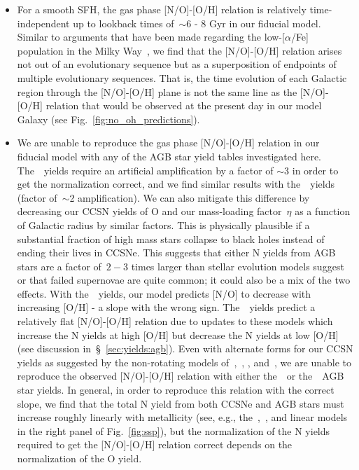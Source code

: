 \documentclass[ms.tex]{subfiles}
\begin{document}
\begin{itemize}
	\item For a smooth SFH, the gas phase [N/O]-[O/H] relation is relatively
	time-independent up to lookback times of~$\sim$6 - 8 Gyr in our fiducial
	model.
	Similar to arguments that have been made regarding the low-[$\alpha$/Fe]
	population in the Milky Way~\citep[e.g.][]{Schoenrich2009, Sharma2020,
	Johnson2021}, we find that the [N/O]-[O/H] relation arises not out of an
	evolutionary sequence but as a superposition of endpoints of multiple
	evolutionary sequences.
	That is, the time evolution of each Galactic region through the [N/O]-[O/H]
	plane is not the same line as the [N/O]-[O/H] relation that would be
	observed at the present day in our model Galaxy (see
	Fig.~\ref{fig:no_oh_predictions}).

	\item We are unable to reproduce the gas phase [N/O]-[O/H] relation in our
	fiducial model with any of the AGB star yield tables investigated here.
	The~\cristallo~yields require an artificial amplification by a factor of
	$\sim$3 in order to get the normalization correct, and we find similar
	results with the~\ventura~yields (factor of~$\sim$2 amplification).
	We can also mitigate this difference by decreasing our CCSN yields of O
	and our mass-loading factor~$\eta$ as a function of Galactic radius by
	similar factors.
	This is physically plausible if a substantial fraction of high mass stars
	collapse to black holes instead of ending their lives in CCSNe.
	This suggests that either N yields from AGB stars are a factor of~$2 - 3$
	times larger than stellar evolution models suggest or that failed supernovae
	are quite common; it could also be a mix of the two effects.
	With the~\karakasten~yields, our model predicts [N/O] to decrease with
	increasing [O/H] - a slope with the wrong sign.
	The~\karakas~yields predict a relatively flat [N/O]-[O/H] relation due to
	updates to these models which increase the N yields at high [O/H] but
	decrease the N yields at low [O/H] (see discussion
	in~\S~\ref{sec:yields:agb}).
	Even with alternate forms for our CCSN yields as suggested by the
	non-rotating models of~\citet{Woosley1995},~\citet{Nomoto2013},
	\citet{Sukhbold2016}, and~\citet{Limongi2018}, we are unable to
	reproduce the observed [N/O]-[O/H] relation with either the~\karakasten~or
	the~\karakas~AGB star yields.
	In general, in order to reproduce this relation with the correct slope,
	we find that the total N yield from both CCSNe and AGB stars must increase
	roughly linearly with metallicity (see, e.g., the~\cristallo,~\ventura, and
	linear models in the right panel of Fig.~\ref{fig:ssp}), but the
	normalization of the N yields required to get the [N/O]-[O/H] relation
	correct depends on the normalization of the O yield.


\end{itemize}
\end{document}

